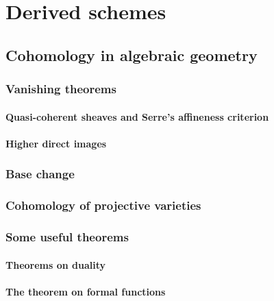 \chapter{Derived schemes} \label{chapter: cohomology_and_derived_schemes}
    \begin{abstract}
        
    \end{abstract}
    
    \minitoc
    
    \section{Cohomology in algebraic geometry}
        \subsection{Vanishing theorems}
            \subsubsection{Quasi-coherent sheaves and Serre's affineness criterion}
            
            \subsubsection{Higher direct images}
        
        \subsection{Base change}
        
        \subsection{Cohomology of projective varieties}
        
        \subsection{Some useful theorems}
            \subsubsection{Theorems on duality}
            
            \subsubsection{The theorem on formal functions}
            
